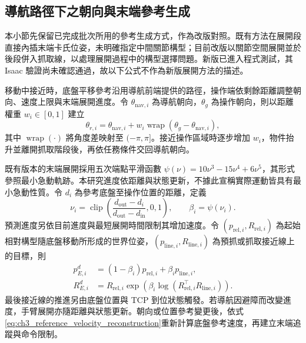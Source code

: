 \subsection{導航路徑下之朝向與末端參考生成}
\label{subsec:navigation_manipulation_reference}

本小節先保留已完成批次所用的參考生成方式，作為改版對照。既有方法在展開段直接內插末端卡氏位姿，未明確指定中間關節構型；目前改版以關節空間展開並於後段併入抓取線，以處理展開過程中的構型選擇問題。新版已進入程式測試，其 Isaac 驗證尚未確認通過，故以下公式不作為新版展開方法的描述。

移動中接近時，底盤平移參考沿用導航前端提供的路徑，操作端依剩餘距離調整朝向、速度上限與末端展開進度。令 $\theta_{\mathrm{nav},i}$ 為導航朝向，$\theta_g$ 為操作朝向，則以距離權重 $w_i\in[0,1]$ 建立
\begin{equation}
    \theta_{r,i}
    =\theta_{\mathrm{nav},i}
     +w_i\operatorname{wrap}
       (\theta_g-\theta_{\mathrm{nav},i}),
    \label{eq:ch3_operation_heading_reference}
\end{equation}
其中 $\operatorname{wrap}(\cdot)$ 將角度差映射至 $(-\pi,\pi]$。接近操作區域時逐步增加 $w_i$，物件抬升並離開抓取階段後，再依任務條件交回導航朝向。

既有版本的末端展開採用五次端點平滑函數 $\psi(\nu)=10\nu^3-15\nu^4+6\nu^5$，其形式參照最小急動軌跡\cite{flash1985coordination}。本研究進度依距離與狀態更新，不據此宣稱實際運動皆具有最小急動性質。令 $d_i$ 為參考底盤至操作位置的距離，定義
\begin{equation}
    \nu_i=
    \operatorname{clip}
      \left(\frac{d_{\mathrm{out}}-d_i}
      {d_{\mathrm{out}}-d_{\mathrm{in}}},0,1\right),
    \qquad \beta_i=\psi(\nu_i).
    \label{eq:ch3_distance_based_arm_progress}
\end{equation}
預測進度另依目前進度與最短展開時間限制其增加速度。令 $(p_{\mathrm{rel},i},R_{\mathrm{rel},i})$ 為起始相對構型隨底盤移動所形成的世界位姿，$(p_{\mathrm{line},i},R_{\mathrm{line},i})$ 為預抓或抓取接近線上的目標，則
\begin{equation}
    \begin{aligned}
        p_{E,i}^{d}
        &=(1-\beta_i)p_{\mathrm{rel},i}
          +\beta_i p_{\mathrm{line},i},\\
        R_{E,i}^{d}
        &=R_{\mathrm{rel},i}
          \exp\!\left(
            \beta_i\log(R_{\mathrm{rel},i}^{\top}R_{\mathrm{line},i})
          \right).
    \end{aligned}
    \label{eq:ch3_continuous_approach_reference}
\end{equation}
最後接近線的推進另由底盤位置與 TCP 到位狀態觸發。若導航因避障而改變進度，手臂展開亦隨距離與狀態更新。朝向或位置參考變更後，依式\eqref{eq:ch3_reference_velocity_reconstruction}重新計算底盤參考速度，再建立末端追蹤與命令限制。

